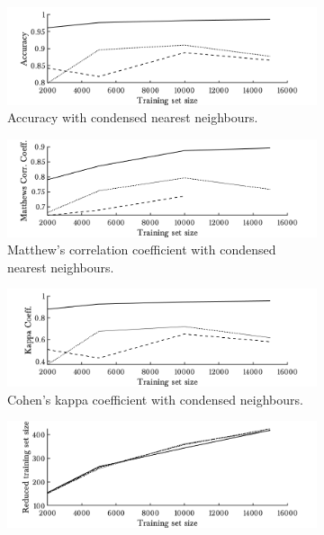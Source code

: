 \begin{figure}[ht!]
        \begin{subfigure}[b]{.97\textwidth}  
            \centering 
            \includegraphics[width=.98\textwidth]{parts/chap-4/img-knn/cnn/acc.png}
            \caption{Accuracy with condensed nearest neighbours.}
        \end{subfigure}
        \vfill
        \begin{subfigure}[b]{.97\textwidth}  
            \centering 
            \includegraphics[width=.98\textwidth]{parts/chap-4/img-knn/cnn/mcc.png}
            \caption{Matthew's correlation coefficient with condensed nearest neighbours.} 
        \end{subfigure}
        \vfill
        \begin{subfigure}[b]{.97\textwidth}  
            \centering 
            \includegraphics[width=.98\textwidth]{parts/chap-4/img-knn/cnn/kappa.png}
            \caption{Cohen's kappa coefficient with condensed neighbours.} 
        \end{subfigure}
        \vfill
        \begin{subfigure}[b]{.97\textwidth}  
            \centering 
            \includegraphics[width=.98\textwidth]{parts/chap-4/img-knn/cnn/red.png}

\end{subfigure}
\end{figure}
